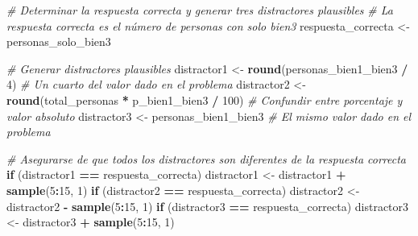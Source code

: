 \documentclass[
]{article}
\newenvironment{Shaded}{\begin{snugshade}}{\end{snugshade}}
\newcommand{\CommentTok}[1]{\textcolor[rgb]{0.56,0.35,0.01}{\textit{#1}}}
\newcommand{\ControlFlowTok}[1]{\textcolor[rgb]{0.13,0.29,0.53}{\textbf{#1}}}
\newcommand{\DecValTok}[1]{\textcolor[rgb]{0.00,0.00,0.81}{#1}}
\newcommand{\FunctionTok}[1]{\textcolor[rgb]{0.13,0.29,0.53}{\textbf{#1}}}
\newcommand{\NormalTok}[1]{#1}
\newcommand{\OtherTok}[1]{\textcolor[rgb]{0.56,0.35,0.01}{#1}}
\newcommand{\SpecialCharTok}[1]{\textcolor[rgb]{0.81,0.36,0.00}{\textbf{#1}}}
\begin{document}
\begin{Shaded}
\begin{Highlighting}[]
\CommentTok{\# Determinar la respuesta correcta y generar tres distractores plausibles}
\CommentTok{\# La respuesta correcta es el número de personas con solo bien3}
\NormalTok{respuesta\_correcta }\OtherTok{\textless{}{-}}\NormalTok{ personas\_solo\_bien3}

\CommentTok{\# Generar distractores plausibles}
\NormalTok{distractor1 }\OtherTok{\textless{}{-}} \FunctionTok{round}\NormalTok{(personas\_bien1\_bien3 }\SpecialCharTok{/} \DecValTok{4}\NormalTok{)  }\CommentTok{\# Un cuarto del valor dado en el problema}
\NormalTok{distractor2 }\OtherTok{\textless{}{-}} \FunctionTok{round}\NormalTok{(total\_personas }\SpecialCharTok{*}\NormalTok{ p\_bien1\_bien3 }\SpecialCharTok{/} \DecValTok{100}\NormalTok{)  }\CommentTok{\# Confundir entre porcentaje y valor absoluto}
\NormalTok{distractor3 }\OtherTok{\textless{}{-}}\NormalTok{ personas\_bien1\_bien3  }\CommentTok{\# El mismo valor dado en el problema}

\CommentTok{\# Asegurarse de que todos los distractores son diferentes de la respuesta correcta}
\ControlFlowTok{if}\NormalTok{ (distractor1 }\SpecialCharTok{==}\NormalTok{ respuesta\_correcta) distractor1 }\OtherTok{\textless{}{-}}\NormalTok{ distractor1 }\SpecialCharTok{+} \FunctionTok{sample}\NormalTok{(}\DecValTok{5}\SpecialCharTok{:}\DecValTok{15}\NormalTok{, }\DecValTok{1}\NormalTok{)}
\ControlFlowTok{if}\NormalTok{ (distractor2 }\SpecialCharTok{==}\NormalTok{ respuesta\_correcta) distractor2 }\OtherTok{\textless{}{-}}\NormalTok{ distractor2 }\SpecialCharTok{{-}} \FunctionTok{sample}\NormalTok{(}\DecValTok{5}\SpecialCharTok{:}\DecValTok{15}\NormalTok{, }\DecValTok{1}\NormalTok{)}
\ControlFlowTok{if}\NormalTok{ (distractor3 }\SpecialCharTok{==}\NormalTok{ respuesta\_correcta) distractor3 }\OtherTok{\textless{}{-}}\NormalTok{ distractor3 }\SpecialCharTok{+} \FunctionTok{sample}\NormalTok{(}\DecValTok{5}\SpecialCharTok{:}\DecValTok{15}\NormalTok{, }\DecValTok{1}\NormalTok{)}


\end{Highlighting}
\end{Shaded}
\end{document}
